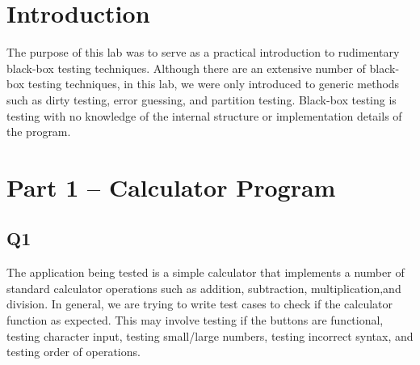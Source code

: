 \documentclass[12pt, letterpaper, titlepage]{article}
\begin{document}
 
\singlespacing

\section{Introduction}
The purpose of this lab was to serve as a practical introduction to rudimentary black-box testing techniques. Although there are an extensive number of black-box testing techniques, in this lab, we were only introduced to generic methods such as dirty testing, error guessing, and partition testing. Black-box testing is testing with no knowledge of the internal structure or implementation details of the program.

\section{Part 1 -- Calculator Program}
\subsection*{Q1}
 The application being tested is a simple calculator that implements a number of standard calculator operations such as addition, subtraction, multiplication,and division. In general, we are trying to write test cases to check if the calculator function as expected. This may involve testing if the buttons are functional, testing character input, testing small/large numbers, testing incorrect syntax, and testing order of operations.
\end{document}
